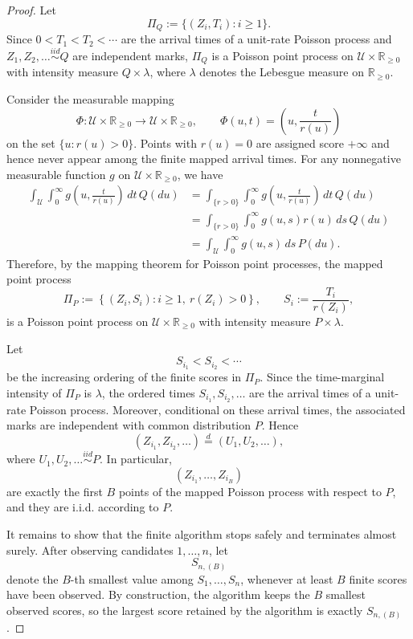 \documentclass{article}
\theoremstyle{plain}
\theoremstyle{definition}
\begin{document}
\begin{proof}
Let
\[
\Pi_Q:=\{(Z_i,T_i):i\ge 1\}.
\]
Since $0<T_1<T_2<\cdots$ are the arrival times of a unit-rate Poisson
process and $Z_1,Z_2,\ldots\stackrel{iid}{\sim}Q$ are independent marks,
$\Pi_Q$ is a Poisson point process on $\mathcal U\times \mathbb R_{\ge 0}$
with intensity measure $Q\times \lambda$, where $\lambda$ denotes the
Lebesgue measure on $\mathbb R_{\ge 0}$.

Consider the measurable mapping
\[
\Phi:\mathcal U\times \mathbb R_{\ge 0}\to
\mathcal U\times \mathbb R_{\ge 0},
\qquad
\Phi(u,t)=\left(u,\frac{t}{r(u)}\right)
\]
on the set $\{u:r(u)>0\}$. Points with $r(u)=0$ are assigned score
$+\infty$ and hence never appear among the finite mapped arrival times.
For any nonnegative measurable function $g$ on
$\mathcal U\times \mathbb R_{\ge 0}$, we have
\[
\begin{aligned}
\int_{\mathcal U}\int_0^\infty
g\left(u,\frac{t}{r(u)}\right)\,dt\,Q(du)
&=
\int_{\{r>0\}}\int_0^\infty
g\left(u,\frac{t}{r(u)}\right)\,dt\,Q(du) \\
&=
\int_{\{r>0\}}\int_0^\infty
g(u,s)r(u)\,ds\,Q(du) \\
&=
\int_{\mathcal U}\int_0^\infty
g(u,s)\,ds\,P(du).
\end{aligned}
\]
Therefore, by the mapping theorem for Poisson point processes, the mapped
point process
\[
\Pi_P:=\left\{\left(Z_i,S_i\right):i\ge 1,\ r(Z_i)>0\right\},
\qquad
S_i:=\frac{T_i}{r(Z_i)},
\]
is a Poisson point process on $\mathcal U\times \mathbb R_{\ge 0}$ with
intensity measure $P\times \lambda$.

Let
\[
S_{i_1}<S_{i_2}<\cdots
\]
be the increasing ordering of the finite scores in $\Pi_P$. Since the
time-marginal intensity of $\Pi_P$ is $\lambda$, the ordered times
$S_{i_1},S_{i_2},\ldots$ are the arrival times of a unit-rate Poisson
process. Moreover, conditional on these arrival times, the associated marks
are independent with common distribution $P$. Hence
\[
(Z_{i_1},Z_{i_2},\ldots)\stackrel{d}{=}(U_1,U_2,\ldots),
\]
where $U_1,U_2,\ldots\stackrel{iid}{\sim}P$. In particular,
\[
(Z_{i_1},\ldots,Z_{i_B})
\]
are exactly the first $B$ points of the mapped Poisson process with respect
to $P$, and they are i.i.d. according to $P$.

It remains to show that the finite algorithm stops safely and terminates
almost surely. After observing candidates $1,\ldots,n$, let
\[
S_{n,(B)}
\]
denote the $B$-th smallest value among $S_1,\ldots,S_n$, whenever at least
$B$ finite scores have been observed. By construction, the algorithm keeps
the $B$ smallest observed scores, so the largest score retained by the
algorithm is exactly $S_{n,(B)}$.


\end{proof}
\end{document}
